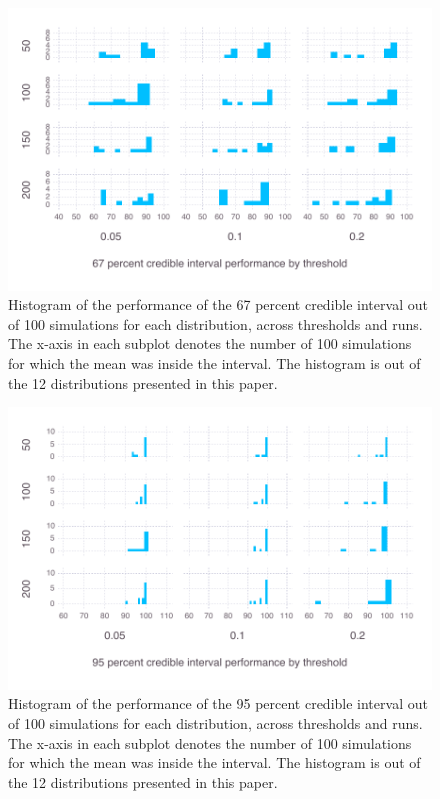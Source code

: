 \begin{figure}[hbt]
  \includegraphics{chapters/Benchmarking/p67ci}
  \caption{Histogram of the performance of the 67 percent credible interval out of 100 simulations for each distribution, across thresholds and runs. The x-axis in each subplot denotes the number of 100 simulations for which the mean was inside the interval. The histogram is out of the 12 distributions presented in this paper.}
  \label{fig:p67}
\end{figure}

\begin{figure}[hbt]
  \includegraphics{chapters/Benchmarking/p95ci}
  \caption{Histogram of the performance of the 95 percent credible interval out of 100 simulations for each distribution, across thresholds and runs. The x-axis in each subplot denotes the number of 100 simulations for which the mean was inside the interval. The histogram is out of the 12 distributions presented in this paper.}
  \label{fig:p95}
\end{figure}

